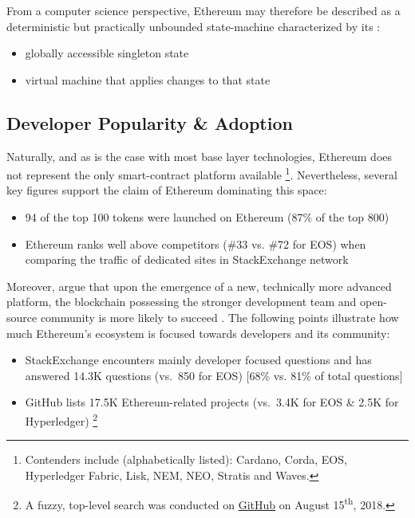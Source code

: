 From a computer science perspective, Ethereum may therefore be described as a deterministic but practically unbounded state-machine characterized by its \cite[p.~23]{Antonopoulos.2018}: 

\begin{itemize}
  \item globally accessible singleton state
  \item virtual machine that applies changes to that state
\end{itemize}

\subsection{Developer Popularity \& Adoption}
\label{sec:ethereumPopularity}
Naturally, and as is the case with most base layer technologies, Ethereum does not represent the only smart-contract platform available \footnote{Contenders include (alphabetically listed): Cardano, Corda, EOS, Hyperledger Fabric, Lisk, NEM, NEO, Stratis and Waves.}. Nevertheless, several key figures support the claim of Ethereum dominating this space: 

\begin{itemize}
  \item 94 of the top 100 tokens were launched on Ethereum (87\% of the top 800) \cite{coinmarketTop100Tokens} \cite{ethereumNetworkState}
  \item Ethereum ranks well above competitors (\#33 vs. \#72 for EOS) when comparing the traffic of dedicated sites in StackExchange network \cite{stackExchangeTechnology}
\end{itemize}

Moreover, \citeauthor{10.1371/journal.pone.0169556} argue that upon the emergence of a new, technically more advanced platform, the blockchain possessing the stronger development team and open-source community is more likely to succeed \cite[p.~14]{10.1371/journal.pone.0169556}. The following points illustrate how much Ethereum's ecosystem is focused towards developers and its community:

\begin{itemize}
  \item StackExchange encounters mainly developer focused questions and has answered 14.3K questions (vs.~850 for EOS) [68\% vs. 81\% of total questions] \cite[p.~6]{blockchainTechnologyGrowth} \cite{stackExchangeTechnology}
  \item GitHub lists 17.5K Ethereum-related projects (vs.~3.4K for EOS \& 2.5K for Hyperledger) \footnote{A fuzzy, top-level search was conducted on \href{https://github.com/search?q=ethereum}{GitHub} on August 15\textsuperscript{th}, 2018.}
\end{itemize}

